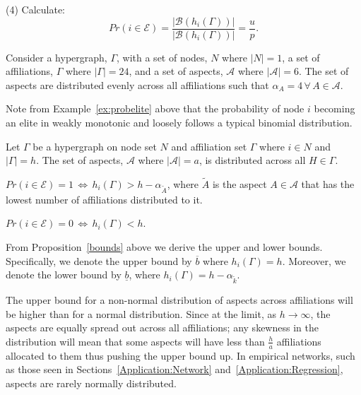 \begin{subappendices}
\begin{abet}
\item[(4)] Calculate:
\[
Pr(i \in \mathcal{E}) = \frac{ | \mathcal{B}(h_{i}(\Gamma)) |}{ | \mathcal{B}(h_{i}(\Gamma)) |} = \frac{u}{p} .
\]
\end{abet}

\begin{example} \label{ex:probelite}
Consider a hypergraph, $\Gamma$, with a set of nodes, $N$ where $|N| = 1$, a set of affiliations, $\Gamma$ where $| \Gamma | = 24$, and a set of aspects, $\mathcal{A}$ where $|\mathcal{A}| = 6$. The set of aspects are distributed evenly across all affiliations such that $\alpha_{A} = 4 \, \forall \, A \in \mathcal{A}$.
\end{example}

Note from Example~\ref{ex:probelite} above that the probability of node $i$ becoming an elite in weakly monotonic and loosely follows a typical binomial distribution.

\begin{proposition} \label{bounds}
Let $\Gamma$ be a hypergraph on node set $N$ and affiliation set $\Gamma$ where $i \in N$ and $|\Gamma| = h$. The set of aspects, $\mathcal{A}$ where $|\mathcal{A}| = a$, is distributed across all $H \in \Gamma$.

\begin{abet}
\item $Pr(i \in \mathcal{E}) = 1 \, \iff \, h_{i}(\Gamma) > h - \alpha_{\tilde{A}}$, where $\tilde{A}$ is the aspect $A \in \mathcal{A}$ that has the lowest number of affiliations distributed to it.

\item $Pr(i \in \mathcal{E}) = 0 \, \iff \, h_{i}(\Gamma) < h$.
\end{abet}
\end{proposition}

From Proposition~\ref{bounds} above we derive the upper and lower bounds. Specifically, we denote the upper bound by $\overline{b}$ where $h_{i}(\Gamma) = h$. Moreover, we denote the lower bound by $\underline{b}$, where $h_{i}(\Gamma) = h - \alpha_{\tilde{k}}$.

The upper bound for a non-normal distribution of aspects across affiliations will be higher than for a normal distribution. Since at the limit, as $h \rightarrow \infty$, the aspects are equally spread out across all affiliations; any skewness in the distribution will mean that some aspects will have less than $\frac{h}{a}$ affiliations allocated to them thus pushing the upper bound up. In empirical networks, such as those seen in Sections~\ref{Application:Network} and~\ref{Application:Regression}, aspects are rarely normally distributed.


\end{subappendices}
